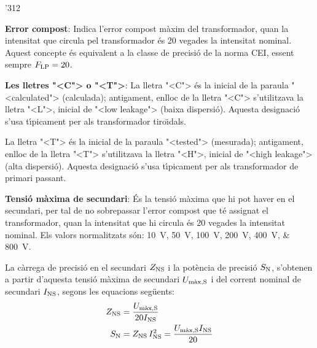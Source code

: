 \begin{dingautolist}{'312}
    \item \textbf{Error compost}: Indica l'error compost m\`{a}xim del
    transformador, quan la intensitat que circula pel
    transformador \'{e}s 20 vegades la intensitat nominal. Aquest concepte
     \'{e}s equivalent a la classe de precisi\'{o} de la norma \textsf{CEI},
     essent sempre $F_\mathrm{LP}=20$.
    \item \textbf{Les lletres {"<}C{">} o {"<}T{">}}: La lletra {"<}C{">} \'{e}s la inicial de la
    paraula  {"<}calculated{">} (calculada); antigament, enlloc de la lletra {"<}C{">}
    s'utilitzava la lletra {"<}L{">}, inicial de {"<}low leakage{">} (baixa
    dispersi\'{o}). Aquesta designaci\'{o} s'usa t\'{\i}picament per als
    transformador tiro\"{\i}dals.

    La lletra {"<}T{">} \'{e}s la inicial de la
    paraula  {"<}tested{">} (mesurada); antigament, enlloc de la lletra {"<}T{">}
    s'utilitzava la lletra {"<}H{">}, inicial de {"<}high leakage{">} (alta
    dispersi\'{o}). Aquesta designaci\'{o} s'usa t\'{\i}picament per als
    transformador de primari passant.
    \item \textbf{Tensi\'{o} m\`{a}xima de secundari}: \'{E}s la tensi\'{o} m\`{a}xima
    que hi pot haver en el secundari, per tal de no sobrepassar l'error compost que t\'{e}
    assignat el transformador, quan la intensitat que hi circula
     \'{e}s 20 vegades la intensitat nominal. Els valors
    normalitzats s\'{o}n: \SIlist{10; 50; 100; 200; 400; 800}{V}.

    La c\`{a}rrega de precisi\'{o} en el secundari
    $Z_\mathrm{NS}$ i la pot\`{e}ncia de precisi\'{o} $S_\mathrm{N}$, s'obtenen a partir d'aquesta
    tensi\'{o} m\`{a}xima de secundari $U_\mathrm{m\grave{a}x,S}$
    i del corrent     nominal de secundari $I_\mathrm{NS}$, segons les equacions seg\"{u}ents:
    \begin{align}
        Z_\mathrm{NS} &= \frac{U_\mathrm{m\grave{a}x,S}}{20 I_\mathrm{NS}}\\
        S_\mathrm{N} &= Z_\mathrm{NS} \,I_\mathrm{NS}^2 = \frac{U_\mathrm{m\grave{a}x,S} I_\mathrm{NS}}{20}
        \label{eq:sn_ti_ieee}
    \end{align}
\end{dingautolist}

